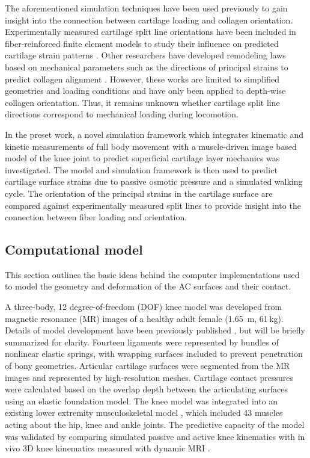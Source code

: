 The aforementioned simulation techniques have been used previously to gain insight into the connection between cartilage loading and collagen orientation. Experimentally measured cartilage split line orientations have been included in fiber-reinforced finite element models to study their influence on predicted cartilage strain patterns \cite{Shim2016,Mononen2012,Li2016}. Other researchers have developed remodeling laws based on mechanical parameters such as the directions of principal strains to predict collagen alignment \cite{Wilson2006,Cortez2016}. However, these works are limited to simplified geometries and loading conditions and have only been applied to depth-wise collagen orientation. Thus, it remains unknown whether cartilage split line directions correspond to mechanical loading during locomotion.

In the preset work, a novel simulation framework which integrates kinematic and kinetic measurements of full body movement with a muscle-driven image based model of the knee joint to predict superficial cartilage layer mechanics was investigated. The model and simulation framework is then used to predict cartilage surface strains due to passive osmotic pressure and a simulated walking cycle. The orientation of the principal strains in the cartilage surface are compared against experimentally measured split lines to provide insight into the connection between fiber loading and orientation.

\subsection{Computational model}
\label{ss:ComputationalAC}

This section outlines the basic ideas behind the computer implementations used to model the geometry and deformation of the AC surfaces and their contact.

A three-body, 12 degree-of-freedom (DOF) knee model was developed from magnetic resonance (MR) images of a healthy adult female (1.65\, m, 61\,kg). Details of model development have been previously published \cite{Lenhart2015}, but will be briefly summarized for clarity. Fourteen ligaments were represented by bundles of nonlinear elastic springs, with wrapping surfaces included to prevent penetration of bony geometries. Articular cartilage surfaces were segmented from the MR images and represented by high-resolution meshes. Cartilage contact pressures were calculated based on the overlap depth between the articulating surfaces using an elastic foundation model. The knee model was integrated into an existing lower extremity musculoskeletal model \cite{Arnold2010}, which included 43 muscles acting about the hip, knee and ankle joints. The predictive capacity of the model was validated by comparing simulated passive and active knee kinematics with in vivo 3D knee kinematics measured with dynamic MRI \cite{Lenhart2015}.

